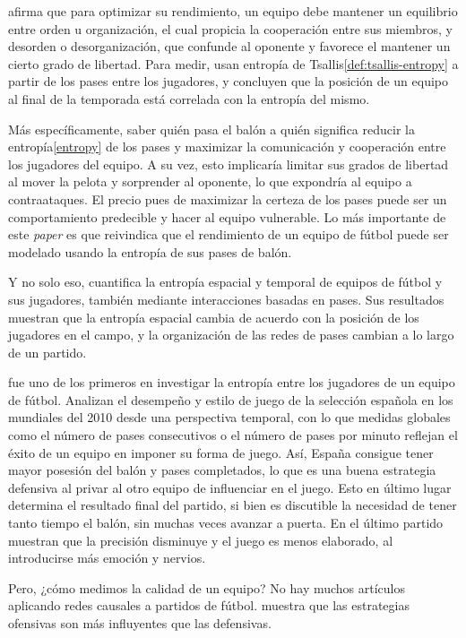 \cite{entropy-analysis} afirma que para optimizar su rendimiento, un 
equipo debe mantener un equilibrio entre orden u organización, el cual 
propicia la cooperación entre sus miembros, y desorden o desorganización, que confunde 
al oponente y favorece el mantener un cierto grado de libertad. Para medir, usan entropía de 
Tsallis\ref{def:tsallis-entropy} a partir de los pases entre los jugadores, y concluyen que la posición de un equipo 
al final de la temporada está correlada con la entropía del mismo. 

Más específicamente, saber quién pasa el balón a quién significa reducir la entropía\ref{entropy} de los pases y maximizar 
la comunicación y cooperación entre los jugadores del equipo. A su vez, esto implicaría limitar sus 
grados de libertad al mover la pelota y sorprender al oponente, lo que expondría al equipo a contraataques. El precio 
pues de maximizar la certeza de los pases puede ser un comportamiento predecible y hacer al equipo vulnerable. Lo más importante 
de este \textit{paper} es que reivindica que el rendimiento de un equipo de fútbol puede 
ser modelado usando la entropía de sus pases de balón.

Y no solo eso, \cite{spatial-and-temporal-entropies} cuantifica la entropía espacial y temporal de 
equipos de fútbol y sus jugadores, también mediante interacciones basadas en pases. Sus resultados 
muestran que la entropía espacial cambia de acuerdo con la posición de los jugadores en el campo, y la 
organización de las redes de pases cambian a lo largo de un partido. 

\cite{network-analysis} fue uno de los primeros en investigar la entropía entre los jugadores de un equipo de 
fútbol. Analizan el desempeño y estilo de juego de la selección española en los mundiales del 2010 desde una 
perspectiva temporal, con lo que medidas globales como el número de pases consecutivos o el número de 
pases por minuto reflejan el éxito de un equipo en imponer su forma de juego.
Así, España consigue tener mayor posesión del balón y pases completados, lo que es una buena estrategia defensiva 
al privar al otro equipo de influenciar en el juego. Esto en último lugar determina el resultado final del partido, 
si bien es discutible la necesidad de tener tanto tiempo el balón, sin muchas veces avanzar a puerta. En el 
último partido muestran que la precisión disminuye y el juego es menos elaborado, al introducirse 
más emoción y nervios.

Pero, ¿cómo medimos la calidad de un equipo? No hay muchos artículos aplicando redes causales a partidos de 
fútbol. \cite{cerqueira} muestra que las estrategias ofensivas son más influyentes que las defensivas.




 